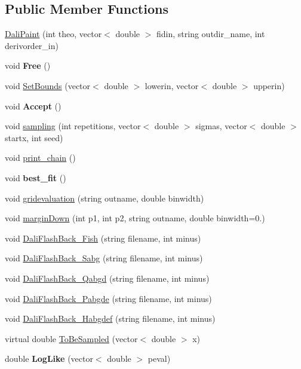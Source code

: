 \subsection*{Public Member Functions}
\begin{DoxyCompactItemize}
\item 
\hyperlink{classDaliPaint_a271c2e670c70c456797d0da0c1d92d07}{Dali\-Paint} (int theo, vector$<$ double $>$ fidin, string outdir\-\_\-name, int derivorder\-\_\-in)
\item 
\hypertarget{classDaliPaint_a671dd06b3014d1fe082df8e87342119c}{void {\bfseries Free} ()}\label{classDaliPaint_a671dd06b3014d1fe082df8e87342119c}

\item 
void \hyperlink{classDaliPaint_a1fd6f80ad97e8acf5211393bec950445}{Set\-Bounds} (vector$<$ double $>$ lowerin, vector$<$ double $>$ upperin)
\item 
\hypertarget{classDaliPaint_a4c72640e346e8215c0094b2ffee19f61}{void {\bfseries Accept} ()}\label{classDaliPaint_a4c72640e346e8215c0094b2ffee19f61}

\item 
void \hyperlink{classDaliPaint_a627a9e5ea61d307cb46208c8384ab4e8}{sampling} (int repetitions, vector$<$ double $>$ sigmas, vector$<$ double $>$ startx, int seed)
\item 
void \hyperlink{classDaliPaint_a0891e14f835f9d47f07626534c48fdc9}{print\-\_\-chain} ()
\item 
\hypertarget{classDaliPaint_affb71713e0ea7523da9421d7469cc725}{void {\bfseries best\-\_\-fit} ()}\label{classDaliPaint_affb71713e0ea7523da9421d7469cc725}

\item 
void \hyperlink{classDaliPaint_af2498c6aa573ed4495bd4dd6dff6b559}{gridevaluation} (string outname, double binwidth)
\item 
void \hyperlink{classDaliPaint_a5d7733050257d8b34c12ed3ed47a1fed}{margin\-Down} (int p1, int p2, string outname, double binwidth=0.)
\item 
void \hyperlink{classDaliPaint_a624e6e3ca606d45692636765242af635}{Dali\-Flash\-Back\-\_\-\-Fish} (string filename, int minus)
\item 
void \hyperlink{classDaliPaint_a0d7210f5b05e4734763c961be08c77a0}{Dali\-Flash\-Back\-\_\-\-Sabg} (string filename, int minus)
\item 
void \hyperlink{classDaliPaint_a82625446a081936b9fd6cd96f23e997c}{Dali\-Flash\-Back\-\_\-\-Qabgd} (string filename, int minus)
\item 
void \hyperlink{classDaliPaint_a998c9b573ce41a2cc3f7cbad47eb5263}{Dali\-Flash\-Back\-\_\-\-Pabgde} (string filename, int minus)
\item 
void \hyperlink{classDaliPaint_acab49907b4f9c5889f1833e2f02fd54d}{Dali\-Flash\-Back\-\_\-\-Habgdef} (string filename, int minus)
\item 
virtual double \hyperlink{classDaliPaint_a077c7a0233c461cd316b74a889ad6270}{To\-Be\-Sampled} (vector$<$ double $>$ x)
\item 
\hypertarget{classDaliPaint_ac96cc46976849826c5d6c8a36b6738a4}{double {\bfseries Log\-Like} (vector$<$ double $>$ peval)}\label{classDaliPaint_ac96cc46976849826c5d6c8a36b6738a4}


\end{DoxyCompactItemize}
